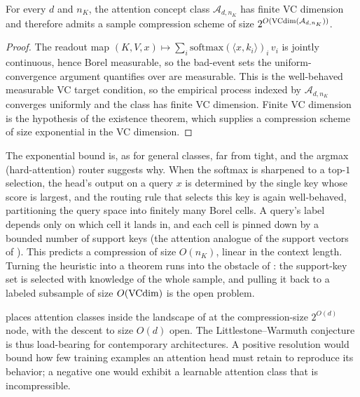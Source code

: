 \begin{prop}
\label{prop:attention-compression}
For every $d$ and $n_K$, the attention concept class $\mathcal{A}_{d,n_K}$ has
finite VC dimension and therefore admits a sample compression scheme of size
$2^{O(\mathrm{VCdim}(\mathcal{A}_{d,n_K}))}$.
\end{prop}

\begin{proof}
The readout map
$(K, V, x) \mapsto \sum_i \mathrm{softmax}(\langle x,k_i\rangle)_i\, v_i$ is
jointly continuous, hence Borel measurable, so the bad-event sets the
uniform-convergence argument quantifies over are measurable.  This is the
well-behaved measurable VC target
condition, so the empirical process
indexed by $\mathcal{A}_{d,n_K}$ converges uniformly and the class has finite VC
dimension.  Finite VC dimension is the hypothesis of the existence
theorem, which supplies
a compression scheme of size exponential in the VC dimension.
\end{proof}

The exponential bound is, as for general classes, far from tight, and the argmax
(hard-attention) router suggests why.  When the softmax is sharpened to a top-$1$
selection, the head's output on a query $x$ is determined by the single key whose
score is largest, and the routing rule that selects this key is again
well-behaved,
partitioning the query space into finitely many Borel cells.  A query's label
depends only on which cell it lands in, and each cell is pinned down by a bounded
number of support keys (the attention analogue of the support vectors of
).  This predicts a compression of size $O(n_K)$, linear
in the context length.  Turning the heuristic into a theorem runs into the
obstacle of : the support-key set is selected with knowledge
of the whole sample, and pulling it back to a labeled subsample of size $O(\mathrm{VCdim})$
is the open problem.

\begin{remark}
\label{rmk:attention-compression}
 places attention classes inside the landscape
of  at the compression-size $2^{O(d)}$ node, with
the descent to size $O(d)$ open.  The Littlestone--Warmuth conjecture is thus
load-bearing for contemporary architectures.  A positive resolution would bound
how few training examples an attention head must retain to reproduce its
behavior; a negative one would exhibit a learnable attention class that is
incompressible.
\end{remark}



